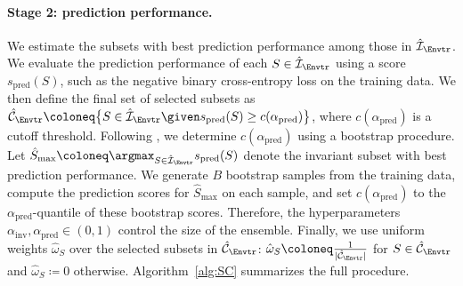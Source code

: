 \paragraph{Stage 2: prediction performance.}
We estimate the subsets with best prediction performance among those in $\hat{\mathcal{I}}_{\Envtr}$. We evaluate the prediction performance of each $S \in \hat{\mathcal{I}}_{\Envtr}$ using a score $s_\mathrm{pred}(S)$, such as the negative binary cross-entropy loss on the training data. We then define the final set of selected subsets as $\hat{\mathcal{C}}_{\Envtr} \coloneq \big\{ S \in \hat{\mathcal{I}}_{\Envtr} \given s_\mathrm{pred}(S) \geq c(\alpha_\mathrm{pred}) \big\}$, where $c(\alpha_\mathrm{pred})$ is a cutoff threshold. Following \citet{pfisterStabilizingVariableSelection2021}, we determine $c(\alpha_\mathrm{pred})$ using a bootstrap procedure. Let $\hat{S}_\mathrm{max} \coloneq \argmax_{S \in \hat{\mathcal{I}}_{\Envtr}} s_\mathrm{pred}(S)$ denote the invariant subset with best prediction performance. We generate $B$ bootstrap samples from the training data, compute the prediction scores for $\hat{S}_\mathrm{max}$ on each sample, and set $c(\alpha_\mathrm{pred})$ to the $\alpha_\mathrm{pred}$-quantile of these bootstrap scores. Therefore, the hyperparameters $\alpha_\mathrm{inv}, \alpha_\mathrm{pred} \in (0,1)$ control the size of the ensemble. Finally, we use uniform weights $\hat{\omega}_S$ over the selected subsets in $\hat{\mathcal{C}}_{\Envtr}$: $\hat{\omega}_S \coloneq \frac{1}{|\hat{\mathcal{C}}_{\Envtr}|}$ for $S \in \hat{\mathcal{C}}_{\Envtr}$ and $\hat{\omega}_S \coloneq 0$ otherwise. Algorithm~\ref{alg:SC} summarizes the full procedure. 


